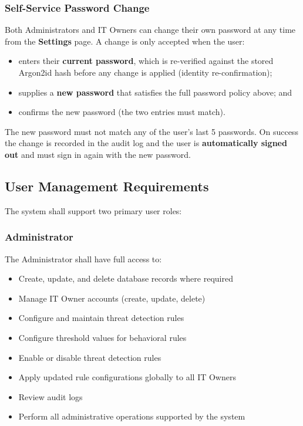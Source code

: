 \documentclass[12pt,a4paper]{article}
\begin{document}
\subsubsection{Self-Service Password Change}
Both Administrators and IT Owners can change their own password at any time from the
\textbf{Settings} page. A change is only accepted when the user:
\begin{itemize}
    \item enters their \textbf{current password}, which is re-verified against the stored
          Argon2id hash before any change is applied (identity re-confirmation);
    \item supplies a \textbf{new password} that satisfies the full password policy above; and
    \item confirms the new password (the two entries must match).
\end{itemize}
The new password must not match any of the user's last 5 passwords. On success the change is
recorded in the audit log and the user is \textbf{automatically signed out} and must sign in
again with the new password.

\subsection{User Management Requirements}

The system shall support two primary user roles:

\subsubsection{Administrator}
The Administrator shall have full access to:
\begin{itemize}
    \item Create, update, and delete database records where required
    \item Manage IT Owner accounts (create, update, delete)
    \item Configure and maintain threat detection rules
    \item Configure threshold values for behavioral rules
    \item Enable or disable threat detection rules
    \item Apply updated rule configurations globally to all IT Owners
    \item Review audit logs
    \item Perform all administrative operations supported by the system
\end{itemize}
\end{document}
